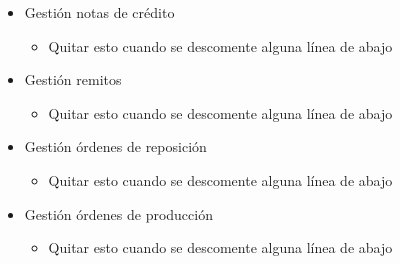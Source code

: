 \begin{itemize}
\begin{itemize}
		\end{itemize}
		\item Gestión notas de crédito
		\begin{itemize}
			\item Quitar esto cuando se descomente alguna línea de abajo
		\end{itemize}
		\item Gestión remitos
		\begin{itemize}
			\item Quitar esto cuando se descomente alguna línea de abajo
		\end{itemize}
		\item Gestión órdenes de reposición
		\begin{itemize}
			\item Quitar esto cuando se descomente alguna línea de abajo
		\end{itemize}
		\item Gestión órdenes de producción
		\begin{itemize}
			\item Quitar esto cuando se descomente alguna línea de abajo

\end{itemize}
\end{itemize}
